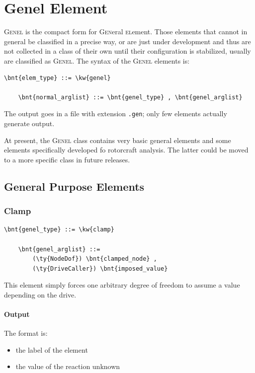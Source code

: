 \section{Genel Element}
\label{sec:EL:GENEL}
\textsc{Genel} is the compact form for \textsc{Gen}eral \textsc{el}ement.
Those elements that cannot in general be classified in a precise way, 
or are just under development and thus are not collected in a class 
of their own until their configuration is stabilized, usually are
classified as \textsc{Genel}.
The syntax of the \textsc{Genel} elements is:
\begin{Verbatim}[commandchars=\\\{\}]
    \bnt{elem_type} ::= \kw{genel}

    \bnt{normal_arglist} ::= \bnt{genel_type} , \bnt{genel_arglist}
\end{Verbatim}

\noindent
The output goes in a file with extension \texttt{.gen}; only few elements
actually generate output.

\noindent
At present, the \textsc{Genel} class contains very basic general elements
and some elements specifically developed fo rotorcraft analysis.
The latter could be moved to a more specific class in future releases.

\subsection{General Purpose Elements}
   
\subsubsection{Clamp}
\label{sec:EL:GENEL:CLAMP}
\begin{Verbatim}[commandchars=\\\{\}]
    \bnt{genel_type} ::= \kw{clamp}

    \bnt{genel_arglist} ::=
        (\ty{NodeDof}) \bnt{clamped_node} ,
        (\ty{DriveCaller}) \bnt{imposed_value}
\end{Verbatim}
This element simply forces one arbitrary degree of freedom to assume a value
depending on the drive.

\paragraph{Output}
The format is:
\begin{itemize}
    \item the label of the element
    \item the value of the reaction unknown
\end{itemize}
  
